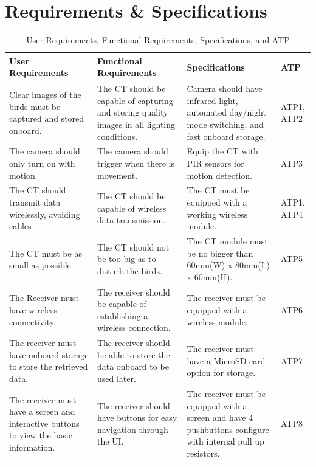 \documentclass[class=report,11pt,crop=false]{standalone}
\begin{document}
\section{Requirements \& Specifications}\label{sc: HW_R_S}
\begin{table}[h]
\centering
\begin{tabular}{|p{4cm}|p{5cm}|p{5cm}|p{1cm}|}
\hline
\textbf{User Requirements} & \textbf{Functional Requirements} & \textbf{Specifications} & \textbf{ATP} \\
\hline
Clear images of the birds must be captured and stored onboard. & The CT should be capable of capturing and storing quality images in all lighting conditions. & Camera should have infrared light, automated day/night mode switching, and fast onboard storage. & ATP1, ATP2 \\
\hline
The camera should only turn on with motion & The camera should trigger when there is movement. & Equip the CT with PIR sensors for motion detection. & ATP3 \\
\hline
The CT should transmit data wirelessly, avoiding cables & The CT should be capable of wireless data transmission. & The CT must be equipped with a working wireless module. & ATP1, ATP4 \\
\hline
The CT must be as small as possible. & The CT should not be too big as to disturb the birds. & The CT module must be no bigger than 60mm(W) x 80mm(L) x 60mm(H). & ATP5 \\
\hline
The Receiver must have wireless connectivity. & The receiver should be capable of establishing a wireless connection. & The receiver must be equipped with a wireless module. & ATP6 \\
\hline
The receiver must have onboard storage to store the retrieved data. & The receiver should be able to store the data onboard to be used later. & The receiver must have a MicroSD card option for storage. & ATP7 \\
\hline
The receiver must have a screen and interactive buttons to view the basic information. & The receiver should have buttons for easy navigation through the UI. & The receiver must be equipped with a screen and have 4 pushbuttons configure with internal pull up resistors. & ATP8 \\
\hline
\end{tabular}
\caption{User Requirements, Functional Requirements, Specifications, and ATP}
\label{tab:HW_Requirements}
\end{table}
\end{document}
